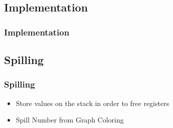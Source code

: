 \begin{frame}
    \section*{Implementation}
    \frametitle{Implementation}
\end{frame}

\begin{frame}
    \section*{Spilling}
    \frametitle{Spilling}
    \begin{itemize}
        \item Store values on the stack in order to free registers
        \item Spill Number from Graph Coloring
    \end{itemize}
\end{frame}
